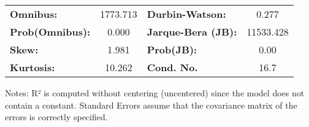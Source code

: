 \begin{center}
\begin{tabular}{lcccccc}
\bottomrule
\end{tabular}
\begin{tabular}{lclc}
\textbf{Omnibus:}       & 1773.713 & \textbf{  Durbin-Watson:     } &     0.277  \\
\textbf{Prob(Omnibus):} &   0.000  & \textbf{  Jarque-Bera (JB):  } & 11533.428  \\
\textbf{Skew:}          &   1.981  & \textbf{  Prob(JB):          } &      0.00  \\
\textbf{Kurtosis:}      &  10.262  & \textbf{  Cond. No.          } &      16.7  \\
\bottomrule
\end{tabular}
\end{center}

Notes: \newline
 [1] R² is computed without centering (uncentered) since the model does not contain a constant. \newline
 [2] Standard Errors assume that the covariance matrix of the errors is correctly specified.